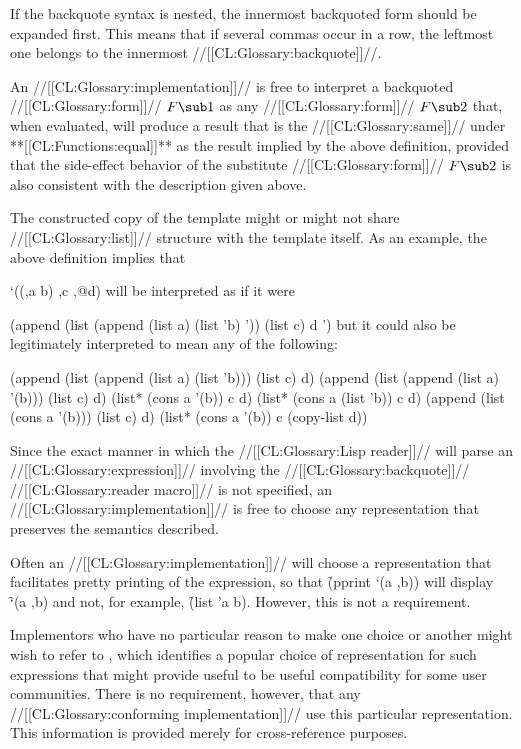If the backquote syntax is nested, the innermost backquoted form should be expanded first.  This means that if several commas occur in a row, the leftmost one belongs to the innermost //[[CL:Glossary:backquote]]//.

An //[[CL:Glossary:implementation]]// is free to interpret a backquoted //[[CL:Glossary:form]]// $F\sub 1$ as any //[[CL:Glossary:form]]// $F\sub 2$ that, when evaluated, will produce a result that is the //[[CL:Glossary:same]]// under **[[CL:Functions:equal]]** as the result implied by the above definition,  provided that the side-effect behavior of the substitute //[[CL:Glossary:form]]// $F\sub 2$  is also consistent with the description given above.

The constructed copy of the template might or might not share //[[CL:Glossary:list]]// structure with the template itself.  As an example, the above definition implies that

\code
 `((,a b) ,c ,@d) \endcode will be interpreted as if it were

\code
 (append (list (append (list a) (list 'b) '\nil)) (list c) d '\nil) \endcode but it could also be legitimately interpreted to mean any of the following:

\code
 (append (list (append (list a) (list 'b))) (list c) d)
 (append (list (append (list a) '(b))) (list c) d)
 (list* (cons a '(b)) c d)
 (list* (cons a (list 'b)) c d)
 (append (list (cons a '(b))) (list c) d)
 (list* (cons a '(b)) c (copy-list d)) \endcode

Since the exact manner in which the //[[CL:Glossary:Lisp reader]]// will parse an //[[CL:Glossary:expression]]// involving the //[[CL:Glossary:backquote]]// //[[CL:Glossary:reader macro]]//  is not specified, an //[[CL:Glossary:implementation]]// is free to choose any representation that preserves the semantics described.

Often an //[[CL:Glossary:implementation]]// will choose a representation that facilitates pretty printing of the expression, so that \f{(pprint `(a ,b))} will display \f{`(a ,b)} and not, for example, \f{(list 'a b)}.  However, this is not a requirement.

Implementors who have no particular reason to make one choice or another might wish to refer to {\IEEEScheme}, which identifies a popular choice of representation for such expressions that might provide useful to be useful compatibility for some user communities.  There is no requirement, however, that any //[[CL:Glossary:conforming implementation]]// use this particular representation. This information is provided merely for cross-reference purposes.


